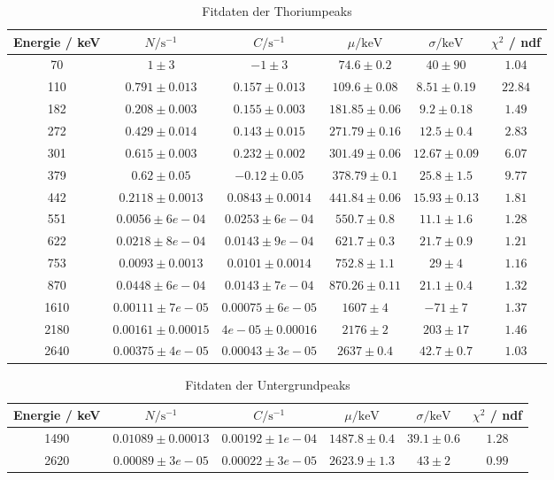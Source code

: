 \documentclass[12pt,listof=totoc]{scrartcl}
\begin{document}
\begin{table}[h!]
	\footnotesize\centering
	\begin{tabular}{|c||c|c|c|c||c|}
		\hline
		Energie / keV&$N/\mathrm{s^{-1}}$&$C/\mathrm{s^{-1}}$&$\mu/\mathrm{keV}$&$\sigma/\mathrm{keV}$&$\chi^2$ / ndf\\\hline\hline70&$1\pm3$&$-1\pm3$&$74.6\pm0.2$&$40\pm90$&$1.04$\\
		110&$0.791\pm0.013$&$0.157\pm0.013$&$109.6\pm0.08$&$8.51\pm0.19$&$22.84$\\
		182&$0.208\pm0.003$&$0.155\pm0.003$&$181.85\pm0.06$&$9.2\pm0.18$&$1.49$\\
		272&$0.429\pm0.014$&$0.143\pm0.015$&$271.79\pm0.16$&$12.5\pm0.4$&$2.83$\\
		301&$0.615\pm0.003$&$0.232\pm0.002$&$301.49\pm0.06$&$12.67\pm0.09$&$6.07$\\
		379&$0.62\pm0.05$&$-0.12\pm0.05$&$378.79\pm0.1$&$25.8\pm1.5$&$9.77$\\
		442&$0.2118\pm0.0013$&$0.0843\pm0.0014$&$441.84\pm0.06$&$15.93\pm0.13$&$1.81$\\
		551&$0.0056\pm6e-04$&$0.0253\pm6e-04$&$550.7\pm0.8$&$11.1\pm1.6$&$1.28$\\
		622&$0.0218\pm8e-04$&$0.0143\pm9e-04$&$621.7\pm0.3$&$21.7\pm0.9$&$1.21$\\
		753&$0.0093\pm0.0013$&$0.0101\pm0.0014$&$752.8\pm1.1$&$29\pm4$&$1.16$\\
		870&$0.0448\pm6e-04$&$0.0143\pm7e-04$&$870.26\pm0.11$&$21.1\pm0.4$&$1.32$\\
		1610&$0.00111\pm7e-05$&$0.00075\pm6e-05$&$1607\pm4$&$-71\pm7$&$1.37$\\
		2180&$0.00161\pm0.00015$&$4e-05\pm0.00016$&$2176\pm2$&$203\pm17$&$1.46$\\
		2640&$0.00375\pm4e-05$&$0.00043\pm3e-05$&$2637\pm0.4$&$42.7\pm0.7$&$1.03$\\
		\hline\end{tabular}
	\caption{Fitdaten der Thoriumpeaks\label{thoriumtable}}
\end{table}


\begin{table}[h!]
	\footnotesize\centering
	\begin{tabular}{|c||c|c|c|c||c|}
		\hline
		Energie / keV&$N/\mathrm{s^{-1}}$&$C/\mathrm{s^{-1}}$&$\mu/\mathrm{keV}$&$\sigma/\mathrm{keV}$&$\chi^2$ / ndf\\\hline\hline1490&$0.01089\pm0.00013$&$0.00192\pm1e-04$&$1487.8\pm0.4$&$39.1\pm0.6$&$1.28$\\
		2620&$0.00089\pm3e-05$&$0.00022\pm3e-05$&$2623.9\pm1.3$&$43\pm2$&$0.99$\\
		\hline\end{tabular}
	\caption{Fitdaten der Untergrundpeaks\label{untergrundtable}}
\end{table}
\end{document}
